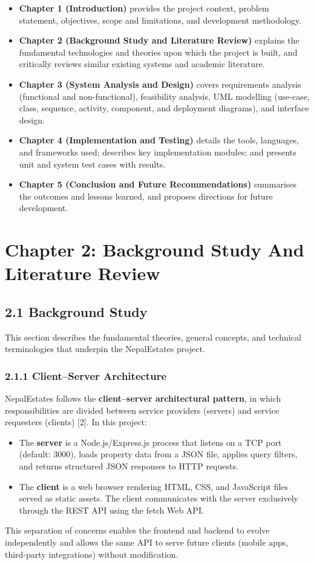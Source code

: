 \documentclass[12pt,a4paper]{report}
\begin{document}
\begin{itemize}
  \item \textbullet{} \textbf{Chapter 1 (Introduction)} provides the project context, problem statement, objectives, scope and limitations, and development methodology.
  \item \textbullet{} \textbf{Chapter 2 (Background Study and Literature Review)} explains the fundamental technologies and theories upon which the project is built, and critically reviews similar existing systems and academic literature.
  \item \textbullet{} \textbf{Chapter 3 (System Analysis and Design)} covers requirements analysis (functional and non-functional), feasibility analysis, UML modelling (use-case, class, sequence, activity, component, and deployment diagrams), and interface design.
  \item \textbullet{} \textbf{Chapter 4 (Implementation and Testing)} details the tools, languages, and frameworks used; describes key implementation modules; and presents unit and system test cases with results.
  \item \textbullet{} \textbf{Chapter 5 (Conclusion and Future Recommendations)} summarises the outcomes and lessons learned, and proposes directions for future development.
\end{itemize}
\chapter{Chapter 2: Background Study And Literature Review}
\section{2.1 Background Study}
This section describes the fundamental theories, general concepts, and technical terminologies that underpin the NepalEstates project.

\subsection{2.1.1 Client--Server Architecture}
NepalEstates follows the \textbf{client--server architectural pattern}, in which responsibilities are divided between service providers (servers) and service requesters (clients) [2]. In this project:

\begin{itemize}
  \item \textbullet{} The \textbf{server} is a Node.js/Express.js process that listens on a TCP port (default: 3000), loads property data from a JSON file, applies query filters, and returns structured JSON responses to HTTP requests.
  \item \textbullet{} The \textbf{client} is a web browser rendering HTML, CSS, and JavaScript files served as static assets. The client communicates with the server exclusively through the REST API using the fetch Web API.
\end{itemize}
This separation of concerns enables the frontend and backend to evolve independently and allows the same API to serve future clients (mobile apps, third-party integrations) without modification.
\end{document}
